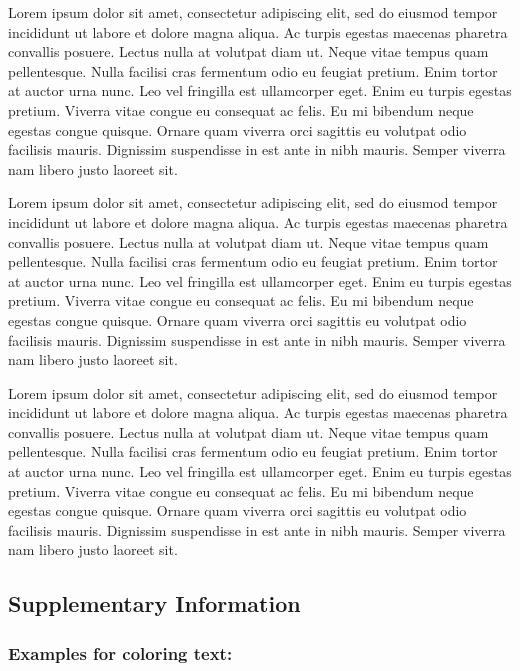 \documentclass[
  twocolumn]{article}
\begin{document}
Lorem ipsum dolor sit amet, consectetur adipiscing elit, sed do eiusmod
tempor incididunt ut labore et dolore magna aliqua. Ac turpis egestas
maecenas pharetra convallis posuere. Lectus nulla at volutpat diam ut.
Neque vitae tempus quam pellentesque. Nulla facilisi cras fermentum odio
eu feugiat pretium. Enim tortor at auctor urna nunc. Leo vel fringilla
est ullamcorper eget. Enim eu turpis egestas pretium. Viverra vitae
congue eu consequat ac felis. Eu mi bibendum neque egestas congue
quisque. Ornare quam viverra orci sagittis eu volutpat odio facilisis
mauris. Dignissim suspendisse in est ante in nibh mauris. Semper viverra
nam libero justo laoreet sit.

Lorem ipsum dolor sit amet, consectetur adipiscing elit, sed do eiusmod
tempor incididunt ut labore et dolore magna aliqua. Ac turpis egestas
maecenas pharetra convallis posuere. Lectus nulla at volutpat diam ut.
Neque vitae tempus quam pellentesque. Nulla facilisi cras fermentum odio
eu feugiat pretium. Enim tortor at auctor urna nunc. Leo vel fringilla
est ullamcorper eget. Enim eu turpis egestas pretium. Viverra vitae
congue eu consequat ac felis. Eu mi bibendum neque egestas congue
quisque. Ornare quam viverra orci sagittis eu volutpat odio facilisis
mauris. Dignissim suspendisse in est ante in nibh mauris. Semper viverra
nam libero justo laoreet sit.

Lorem ipsum dolor sit amet, consectetur adipiscing elit, sed do eiusmod
tempor incididunt ut labore et dolore magna aliqua. Ac turpis egestas
maecenas pharetra convallis posuere. Lectus nulla at volutpat diam ut.
Neque vitae tempus quam pellentesque. Nulla facilisi cras fermentum odio
eu feugiat pretium. Enim tortor at auctor urna nunc. Leo vel fringilla
est ullamcorper eget. Enim eu turpis egestas pretium. Viverra vitae
congue eu consequat ac felis. Eu mi bibendum neque egestas congue
quisque. Ornare quam viverra orci sagittis eu volutpat odio facilisis
mauris. Dignissim suspendisse in est ante in nibh mauris. Semper viverra
nam libero justo laoreet sit.

\hypertarget{supplementary-information}{%
\subsection{Supplementary Information}\label{supplementary-information}}

\hypertarget{examples-for-coloring-text}{%
\subsubsection{Examples for coloring
text:}\label{examples-for-coloring-text}}
\end{document}
